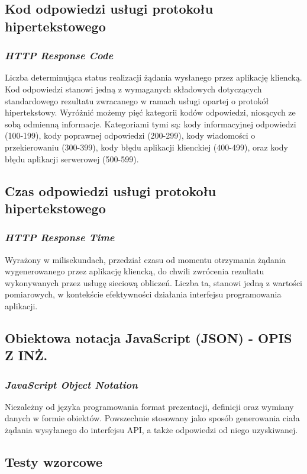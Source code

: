 \subsection*{Kod odpowiedzi usługi protokołu hipertekstowego}
\subsubsection{\textit{HTTP Response Code}}
Liczba determinująca status realizacji żądania wysłanego przez aplikację kliencką. Kod odpowiedzi stanowi jedną z wymaganych składowych dotyczących standardowego rezultatu zwracanego w ramach usługi opartej o protokół hipertekstowy. Wyróżnić możemy pięć kategorii kodów odpowiedzi, niosących ze sobą odmienną informacje. Kategoriami tymi są: kody informacyjnej odpowiedzi (100-199), kody poprawnej odpowiedzi (200-299), kody wiadomości o przekierowaniu (300-399), kody błędu aplikacji klienckiej (400-499), oraz kody błędu aplikacji serwerowej (500-599).

\subsection*{Czas odpowiedzi usługi protokołu hipertekstowego}
\subsubsection{\textit{HTTP Response Time}}
Wyrażony w milisekundach, przedział czasu od momentu otrzymania żądania wygenerowanego przez aplikację kliencką, do chwili zwrócenia rezultatu wykonywanych przez usługę sieciową obliczeń. Liczba ta, stanowi jedną z wartości pomiarowych, w kontekście efektywności działania interfejsu programowania aplikacji.  

\subsection*{Obiektowa notacja JavaScript (JSON) - OPIS Z INŻ.}
\subsubsection{\textit{JavaScript Object Notation}}
Niezależny od języka programowania format prezentacji, definicji oraz wymiany danych w formie obiektów. Powszechnie stosowany jako sposób generowania ciała żądania wysyłanego do interfejsu API, a także odpowiedzi od niego uzyskiwanej.

\subsection*{Testy wzorcowe}
